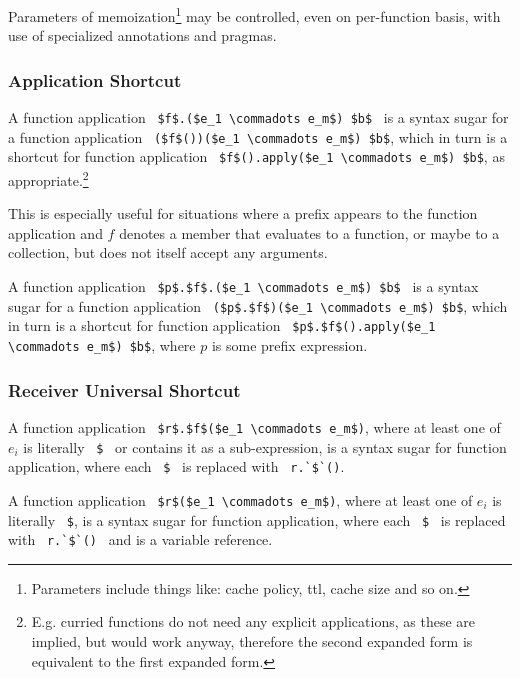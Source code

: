 Parameters of memoization\footnote{Parameters include things like: cache policy, ttl, cache size and so on.} may be controlled, even on per-function basis, with use of specialized annotations and pragmas. 




\subsubsection{Application Shortcut}
\label{sec:function-application-shortcut}

A function application ~\lstinline!$f$.($e_1 \commadots e_m$) $b$!~ is a syntax sugar for a function application ~\lstinline!($f$())($e_1 \commadots e_m$) $b$!, which in turn is a shortcut for function application ~\lstinline!$f$().apply($e_1 \commadots e_m$) $b$!, as appropriate.\footnote{E.g. curried functions do not need any explicit  applications, as these are implied, but would work anyway, therefore the second expanded form is equivalent to the first expanded form.}

This is especially useful for situations where a prefix appears to the function application and $f$ denotes a member that evaluates to a function, or maybe to a collection, but does not itself accept any arguments. 

A function application ~\lstinline!$p$.$f$.($e_1 \commadots e_m$) $b$!~ is a syntax sugar for a function application ~\lstinline!($p$.$f$)($e_1 \commadots e_m$) $b$!, which in turn is a shortcut for function application ~\lstinline!$p$.$f$().apply($e_1 \commadots e_m$) $b$!, where $p$ is some prefix expression. 





\subsubsection{Receiver Universal Shortcut}
\label{sec:receiver-universal-shortcut}

A function application ~\lstinline!$r$.$f$($e_1 \commadots e_m$)!, where at least one of $e_i$ is literally ~\lstinline[mathescape=false]!$!~ or contains it as a sub-expression, is a syntax sugar for function application, where each ~\lstinline[mathescape=false]!$!~ is replaced with ~\lstinline[mathescape=false]!r.`$`()!. 

A function application ~\lstinline!$r$($e_1 \commadots e_m$)!, where at least one of $e_i$ is literally ~\lstinline[mathescape=false]!$!, is a syntax sugar for function application, where each ~\lstinline[mathescape=false]!$!~ is replaced with ~\lstinline[mathescape=false]!r.`$`()!~ and  is a variable reference. 

